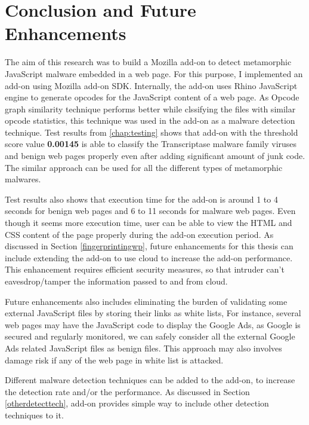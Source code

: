 \chapter{Conclusion and Future Enhancements}

The aim of this research was to build a Mozilla add-on to detect metamorphic JavaScript malware embedded in a web page. For this purpose, I implemented an add-on using Mozilla add-on SDK. Internally, the add-on uses Rhino JavaScript engine to generate opcodes for the JavaScript content of a web page. As Opcode graph similarity technique performs better while clssifying the files with similar opcode statistics, this technique was used in the add-on as a malware detection technique. Test results from \autoref{chap:testing} shows that add-on with the threshold score value \textbf{0.00145} is able to classify the Transcriptase malware family viruses and benign web pages properly even after adding significant amount of junk code. The similar approach can be used for all the different types of metamorphic malwares.

Test results also shows that execution time for the add-on is around 1 to 4 seconds for benign web pages and 6 to 11 seconds for malware web pages. Even though it seems more execution time, user can be able to view the HTML and CSS content of the page properly during the add-on execution period. As discussed in Section \ref{fingerprintingwp}, future enhancements for this thesis can include extending the add-on to use cloud to increase the add-on performance. This enhancement requires efficient security measures, so that intruder can't eavesdrop/tamper the information passed to and from cloud. 

Future enhancements also includes eliminating the burden of validating some external JavaScript files by storing their links as white lists, For instance, several web pages may have the JavaScript code to display the Google Ads, as Google is secured and regularly monitored, we can safely consider all the external Google Ads related JavaScript files as benign files. This approach may also involves damage risk if any of the web page in white list is attacked.

Different malware detection techniques can be added to the add-on, to increase the detection rate and/or the performance. As discussed in Section \ref{otherdetecttech}, add-on provides simple way to include other detection techniques to it.
